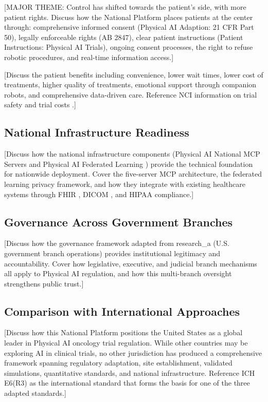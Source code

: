 [MAJOR THEME: Control has shifted towards the patient's side, with more patient
rights. Discuss how the National Platform places patients at the center through:
comprehensive informed consent (Physical AI Adaption: 21 CFR Part 50),
legally enforceable rights (AB 2847), clear patient instructions (Patient
Instructions: Physical AI Trials), ongoing consent processes, the right to
refuse robotic procedures, and real-time information access.]

[Discuss the patient benefits including convenience, lower wait times, lower
cost of treatments, higher quality of treatments, emotional support through
companion robots, and comprehensive data-driven care. Reference NCI
information on trial safety \cite{nci-trials-safety} and trial costs
\cite{nci-trials-paying}.]

\subsection{National Infrastructure Readiness}
\label{subsec:discuss-infrastructure}

[Discuss how the national infrastructure components (Physical AI National MCP
Servers \cite{national-mcp-paper} and Physical AI Federated Learning
\cite{fl-paper}) provide the technical foundation for nationwide deployment.
Cover the five-server MCP architecture, the federated learning privacy
framework, and how they integrate with existing healthcare systems through
FHIR \cite{hl7-fhir}, DICOM \cite{dicom}, and HIPAA \cite{hipaa} compliance.]

\subsection{Governance Across Government Branches}
\label{subsec:discuss-governance}

[Discuss how the governance framework adapted from research\_a (U.S.
government branch operations) provides institutional legitimacy and
accountability. Cover how legislative, executive, and judicial branch
mechanisms all apply to Physical AI regulation, and how this multi-branch
oversight strengthens public trust.]

\subsection{Comparison with International Approaches}
\label{subsec:discuss-international}

[Discuss how this National Platform positions the United States as a global
leader in Physical AI oncology trial regulation. While other countries may
be exploring AI in clinical trials, no other jurisdiction has produced a
comprehensive framework spanning regulatory adaptation, site establishment,
validated simulations, quantitative standards, and national infrastructure.
Reference ICH E6(R3) \cite{ich-e6r3} as the international standard that
forms the basis for one of the three adapted standards.]

